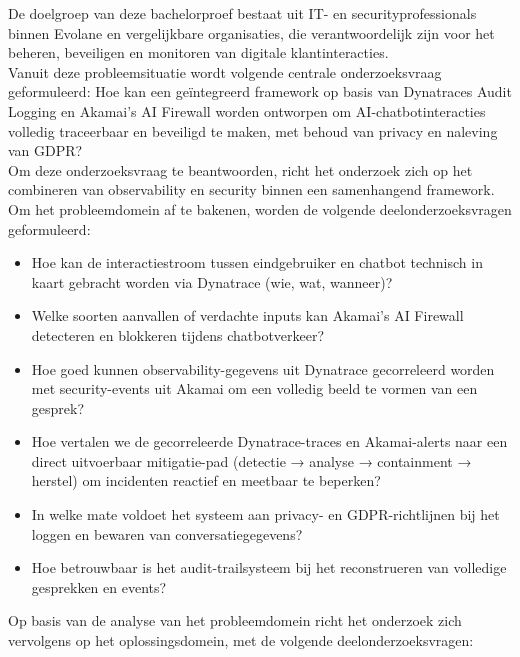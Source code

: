 \noindent De doelgroep van deze bachelorproef bestaat uit IT- en securityprofessionals binnen Evolane en vergelijkbare organisaties, die verantwoordelijk zijn voor het beheren, beveiligen en monitoren van digitale klantinteracties.\\

\noindent Vanuit deze probleemsituatie wordt volgende centrale onderzoeksvraag geformuleerd:
Hoe kan een geïntegreerd framework op basis van Dynatraces Audit Logging en Akamai’s AI Firewall worden ontworpen om AI-chatbotinteracties volledig traceerbaar en beveiligd te maken, met behoud van privacy en naleving van GDPR?\\

\noindent Om deze onderzoeksvraag te beantwoorden, richt het onderzoek zich op het combineren van observability en security binnen een samenhangend framework. Om het probleemdomein af te bakenen, worden de volgende deelonderzoeksvragen geformuleerd:

\begin{itemize}
    \item Hoe kan de interactiestroom tussen eindgebruiker en chatbot technisch in kaart gebracht worden via Dynatrace (wie, wat, wanneer)?
    \item Welke soorten aanvallen of verdachte inputs kan Akamai’s AI Firewall detecteren en blokkeren tijdens chatbotverkeer? 
    \item Hoe goed kunnen observability-gegevens uit Dynatrace gecorreleerd worden met security-events uit Akamai om een volledig beeld te vormen van een gesprek?
    \item Hoe vertalen we de gecorreleerde Dynatrace-traces en Akamai-alerts naar een direct uitvoerbaar mitigatie-pad (detectie → analyse → containment → herstel) om incidenten reactief en meetbaar te beperken?
    \item In welke mate voldoet het systeem aan privacy- en GDPR-richtlijnen bij het loggen en bewaren van conversatiegegevens?
    \item Hoe betrouwbaar is het audit-trailsysteem bij het reconstrueren van volledige gesprekken en events?
\end{itemize}

\noindent Op basis van de analyse van het probleemdomein richt het onderzoek zich vervolgens op het oplossingsdomein, met de volgende deelonderzoeksvragen:


